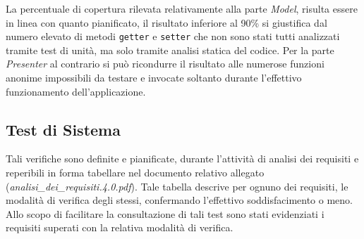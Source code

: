 La percentuale di copertura rilevata relativamente alla parte \textit{Model}, risulta essere in linea con quanto pianificato, il risultato inferiore al 90\% si giustifica dal numero elevato di metodi \texttt{getter} e \texttt{setter} che non sono stati tutti analizzati tramite test di unità, ma solo tramite analisi statica del codice. Per la parte \textit{Presenter} al contrario si può ricondurre il risultato alle numerose funzioni anonime impossibili da testare e invocate soltanto durante l'effettivo funzionamento dell'applicazione.

\clearpage
\subsection{Test di Sistema}
Tali verifiche sono definite e pianificate, durante l'attività di analisi dei requisiti e reperibili in forma tabellare nel documento relativo allegato (\textit{analisi\_dei\_requisiti.4.0.pdf}).
Tale tabella descrive per ognuno dei requisiti, le modalità di verifica degli stessi, confermando l'effettivo soddisfacimento o meno. 
Allo scopo di facilitare la consultazione di tali test sono stati evidenziati i requisiti superati con la relativa modalità di verifica.

